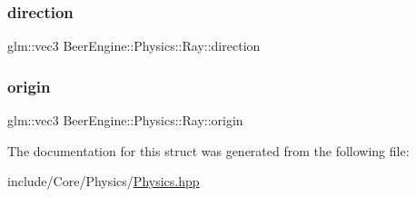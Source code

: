 \subsubsection{\texorpdfstring{direction}{direction}}
{\footnotesize\ttfamily glm\+::vec3 Beer\+Engine\+::\+Physics\+::\+Ray\+::direction}

\mbox{\label{struct_beer_engine_1_1_physics_1_1_ray_a50d88f408e39fb77275d23074ef4c99f}} 
\subsubsection{\texorpdfstring{origin}{origin}}
{\footnotesize\ttfamily glm\+::vec3 Beer\+Engine\+::\+Physics\+::\+Ray\+::origin}



The documentation for this struct was generated from the following file\+:\begin{DoxyCompactItemize}
\item 
include/\+Core/\+Physics/\mbox{\hyperlink{_physics_8hpp}{Physics.\+hpp}}\end{DoxyCompactItemize}
